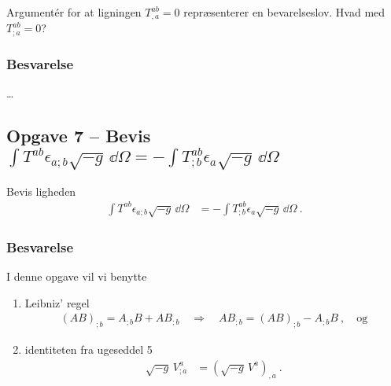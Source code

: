 \documentclass[../main.tex]{subfiles}
\begin{document}
Argumentér for at ligningen $T^{ab}_{,a} = 0$ repræsenterer en bevarelseslov. Hvad med $T^{ab}_{;a} = 0$?


\subsubsection{Besvarelse}

\ldots




\subsection{Opgave 7 -- Bevis $\int T^{ab} \epsilon_{a;b} \sqrt{-g}\, \dd \Omega = - \int T^{ab}_{;b} \epsilon_a \sqrt{-g}\, \dd \Omega$}
\setcounter{subsection}{7}
\setcounter{equation}{0}

Bevis ligheden
\begin{align} \label{eq:Uge6_Opg7_EqualityToBeShown}
    \int T^{ab} \epsilon_{a;b} \sqrt{-g}\, \dd \Omega &= - \int T^{ab}_{;b} \epsilon_a \sqrt{-g}\, \dd \Omega \: .
\end{align}


\subsubsection*{Besvarelse}

I denne opgave vil vi benytte
\begin{enumerate}
    \item Leibniz' regel
        \begin{align}
            (AB)_{;b} = A_{;b}B + AB_{;b}
                \quad \Rightarrow \quad
            AB_{;b} = (AB)_{;b} - A_{;b}B \: , \quad \text{og}
        \end{align}
    \item identiteten fra ugeseddel 5 \cite[lign. 32]{ugeseddel5}
        \begin{align}
            \sqrt{-g}\, V^a_{;a} &= \left( \sqrt{-g}\, V^a \right)_{,a} \: .
        \end{align}
\end{enumerate}
\end{document}
